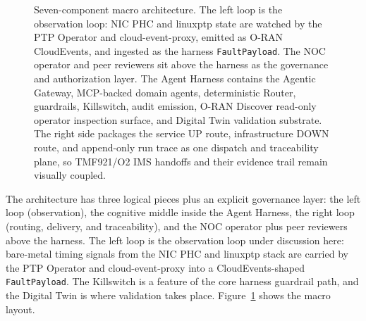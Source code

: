 \documentclass[twocolumn,10pt,a4paper]{article}
\begin{document}
\begin{figure}[t]
{%
}
\caption{Seven-component macro architecture. The left loop is the observation loop: NIC PHC and linuxptp state are watched by the PTP Operator and cloud-event-proxy, emitted as O-RAN CloudEvents, and ingested as the harness \texttt{FaultPayload}. The NOC operator and peer reviewers sit above the harness as the governance and authorization layer. The Agent Harness contains the Agentic Gateway, MCP-backed domain agents, deterministic Router, guardrails, Killswitch, audit emission, O-RAN Discover read-only operator inspection surface, and Digital Twin validation substrate. The right side packages the service UP route, infrastructure DOWN route, and append-only run trace as one dispatch and traceability plane, so TMF921/O2 IMS handoffs and their evidence trail remain visually coupled.}
\label{fig:arch_macro}
\end{figure}

The architecture has three logical pieces plus an explicit governance layer: the left loop (observation), the cognitive middle inside the Agent Harness, the right loop (routing, delivery, and traceability), and the NOC operator plus peer reviewers above the harness. The left loop is the observation loop under discussion here: bare-metal timing signals from the NIC PHC and linuxptp stack are carried by the PTP Operator and cloud-event-proxy into a CloudEvents-shaped \texttt{FaultPayload}. The Killswitch is a feature of the core harness guardrail path, and the Digital Twin is where validation takes place. Figure~\ref{fig:arch_macro} shows the macro layout.
\end{document}
